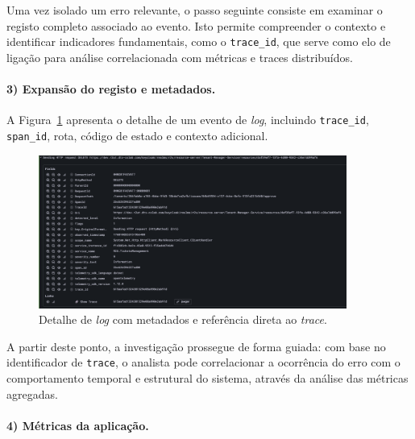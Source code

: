 Uma vez isolado um erro relevante, o passo seguinte consiste em examinar o registo completo 
associado ao evento. Isto permite compreender o contexto e identificar indicadores fundamentais, 
como o \texttt{trace\_id}, que serve como elo de ligação para análise correlacionada com métricas e 
traces distribuídos.


\clearpage

\paragraph{3) Expansão do registo e metadados.}

A Figura~\ref{fig:dash-3} apresenta o detalhe de um evento de \textit{log}, incluindo
\texttt{trace\_id}, \texttt{span\_id}, rota, código de estado e contexto adicional.

\begin{figure}[H]
    \centering
    \includegraphics[width=0.9\textwidth]{images/Grafana/log_expanded.png}
    \caption{Detalhe de \textit{log} com metadados e referência direta ao \textit{trace}.}
    \label{fig:dash-3}
\end{figure}

A partir deste ponto, a investigação prossegue de forma guiada: com base no identificador de \texttt{trace}, 
o analista pode correlacionar a ocorrência do erro com o comportamento temporal e estrutural do sistema, 
através da análise das métricas agregadas.



\paragraph{4) Métricas da aplicação.}

